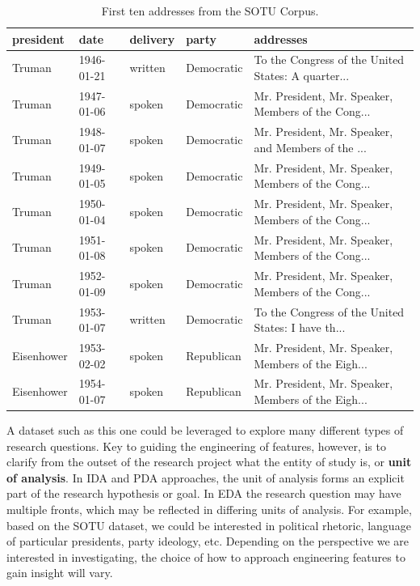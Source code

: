 \documentclass[
  letterpaper,
]{latex/krantz}
\begin{document}
\hypertarget{tbl-eda-sotu-corpus}{}
\begin{table}
\caption{\label{tbl-eda-sotu-corpus}First ten addresses from the SOTU Corpus. }\tabularnewline

\centering
\begin{tabular}{l|l|l|l|l}
\hline
president & date & delivery & party & addresses\\
\hline
Truman & 1946-01-21 & written & Democratic & To the Congress of the United States: A quarter...\\
\hline
Truman & 1947-01-06 & spoken & Democratic & Mr. President, Mr. Speaker, Members of the Cong...\\
\hline
Truman & 1948-01-07 & spoken & Democratic & Mr. President, Mr. Speaker, and Members of the ...\\
\hline
Truman & 1949-01-05 & spoken & Democratic & Mr. President, Mr. Speaker, Members of the Cong...\\
\hline
Truman & 1950-01-04 & spoken & Democratic & Mr. President, Mr. Speaker, Members of the Cong...\\
\hline
Truman & 1951-01-08 & spoken & Democratic & Mr. President, Mr. Speaker, Members of the Cong...\\
\hline
Truman & 1952-01-09 & spoken & Democratic & Mr. President, Mr. Speaker, Members of the Cong...\\
\hline
Truman & 1953-01-07 & written & Democratic & To the Congress of the United States: I have th...\\
\hline
Eisenhower & 1953-02-02 & spoken & Republican & Mr. President, Mr. Speaker, Members of the Eigh...\\
\hline
Eisenhower & 1954-01-07 & spoken & Republican & Mr. President, Mr. Speaker, Members of the Eigh...\\
\hline
\end{tabular}
\end{table}

A dataset such as this one could be leveraged to explore many different
types of research questions. Key to guiding the engineering of features,
however, is to clarify from the outset of the research project what the
entity of study is, or \textbf{unit of analysis}. In IDA and PDA
approaches, the unit of analysis forms an explicit part of the research
hypothesis or goal. In EDA the research question may have multiple
fronts, which may be reflected in differing units of analysis. For
example, based on the SOTU dataset, we could be interested in political
rhetoric, language of particular presidents, party ideology, etc.
Depending on the perspective we are interested in investigating, the
choice of how to approach engineering features to gain insight will
vary.
\end{document}
